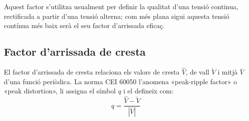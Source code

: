 Aquest factor s'utilitza usualment per definir la qualitat d'una
tensió continua, rectificada a partir d'una tensió alterna; com més
plana sigui aquesta tensió contínua més baix serà el seu factor
d'arrissada eficaç.

\subsection{Factor d'arrissada de cresta}

El factor d'arrissada de cresta relaciona els valors de cresta $\hat{V}$, de vall $\check{V}$  i mitjà $\bar{V}$
 d'una funció periòdica. La norma CEI 60050 l'anomena «peak-ripple factor» o «peak distortion», li assigna el símbol $q$ i el defineix com:
\begin{equation}
    q = \frac{\hat{V} - \check{V}}{|\bar{V}|}
\end{equation}

